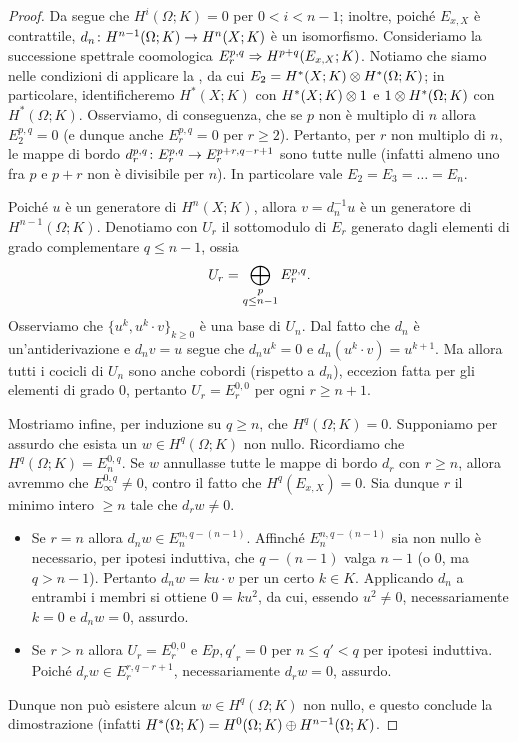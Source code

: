 \begin{proof}
Da \missing{} segue che $H^i(\Omega;K)=0$ per $0<i<n-1$; inoltre, poiché $E_{x,X}$ è contrattile, $d_n\colon H^{n-1}(\Omega;K)\to H^n(X;K)$ è un isomorfismo.  Consideriamo la successione spettrale coomologica $E^{p,q}_r\Rightarrow H^{p+q}(E_{x,X};K)$. Notiamo che siamo nelle condizioni di applicare la , da cui $E_2=H^*(X;K)\mathbin{\otimes} H^*(\Omega;K)$; in particolare, identificheremo $H^*(X;K)$ con $H^*(X;K)\mathbin{\otimes} 1$ e $1\mathbin{\otimes} H^*(\Omega;K)$ con $H^*(\Omega;K)$. Osserviamo, di conseguenza, che se $p$ non è multiplo di $n$ allora $E^{p,q}_2=0$ (e dunque anche $E^{p,q}_r=0$ per $r\ge2$). Pertanto, per $r$ non multiplo di $n$, le mappe di bordo $d^{p,q}_r\colon E^{p,q}_r\to E^{p+r,q-r+1}_r$ sono tutte nulle (infatti almeno uno fra $p$ e $p+r$ non è divisibile per $n$). In particolare vale $E_2=E_3=\ldots=E_n$.

Poiché $u$ è un generatore di $H^n(X;K)$, allora $v=d_n^{-1}u$ è un generatore di $H^{n-1}(\Omega;K)$. Denotiamo con $U_r$ il sottomodulo di $E_r$ generato dagli elementi di grado complementare $q\le n-1$, ossia
$$
U_r=\bigoplus_{\substack{p\\q\le n-1}}E^{p,q}_r.
$$
Osserviamo che $\{u^k,u^k\cdot v\}_{k\ge 0}$ è una base di $U_n$. Dal fatto che $d_n$ è un'antiderivazione e $d_nv=u$ segue che $d_n u^k=0$ e $d_n(u^k\cdot v)=u^{k+1}$. Ma allora tutti i cocicli di $U_n$ sono anche cobordi (rispetto a $d_n$), eccezion fatta per gli elementi di grado $0$, pertanto $U_r=E^{0,0}_r$ per ogni $r\ge n+1$.

Mostriamo infine, per induzione su $q\ge n$, che $H^q(\Omega;K)=0$. Supponiamo per assurdo che esista un $w\in H^q(\Omega;K)$ non nullo. Ricordiamo che $H^q(\Omega;K)=E^{0,q}_n$. Se $w$ annullasse tutte le mappe di bordo $d_r$ con $r\ge n$, allora avremmo che $E^{0,q}_\infty\neq 0$, contro il fatto che $H^q(E_{x,X})=0$. Sia dunque $r$ il minimo intero $\ge n$ tale che $d_rw\neq 0$.
\begin{itemize}
\item Se $r=n$ allora $d_nw\in E^{n,q-(n-1)}_n$. Affinché $E^{n,q-(n-1)}_n$ sia non nullo è necessario, per ipotesi induttiva, che $q-(n-1)$ valga $n-1$ (o $0$, ma $q>n-1$). Pertanto $d_nw=ku\cdot v$ per un certo $k\in K$. Applicando $d_n$ a entrambi i membri si ottiene $0=ku^2$, da cui, essendo $u^2\neq 0$, necessariamente $k=0$ e $d_nw=0$, assurdo.
\item Se $r>n$ allora $U_r=E^{0,0}_r$ e $E{p,q'}_r=0$ per $n\le q'<q$ per ipotesi induttiva. Poiché $d_rw\in E^{r,q-r+1}_r$, necessariamente $d_rw=0$, assurdo.
\end{itemize}
Dunque non può esistere alcun $w\in H^q(\Omega;K)$ non nullo, e questo conclude la dimostrazione (infatti $H^*(\Omega;K)=H^0(\Omega;K)\mathbin{\oplus} H^{n-1}(\Omega;K)$.
\end{proof}
